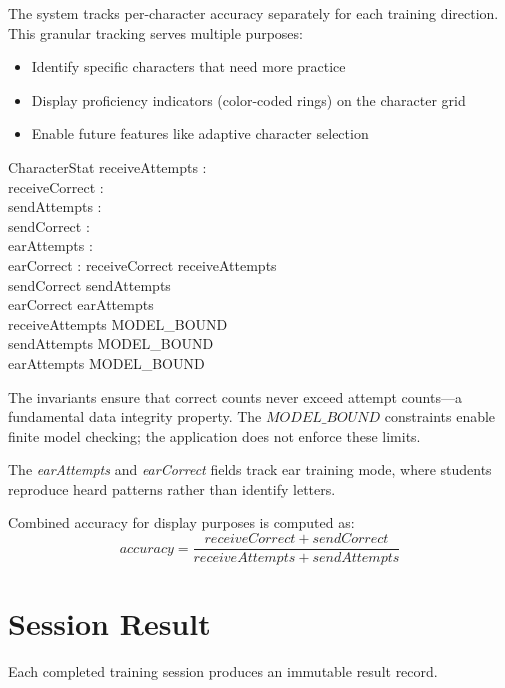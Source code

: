 \documentclass[a4paper,10pt,fleqn]{article}
\begin{document}
The system tracks per-character accuracy separately for each training direction.
This granular tracking serves multiple purposes:

\begin{itemize}
\item Identify specific characters that need more practice
\item Display proficiency indicators (color-coded rings) on the character grid
\item Enable future features like adaptive character selection
\end{itemize}

\begin{schema}{CharacterStat}
receiveAttempts : \nat \\
receiveCorrect : \nat \\
sendAttempts : \nat \\
sendCorrect : \nat \\
earAttempts : \nat \\
earCorrect : \nat
\where
receiveCorrect \leq receiveAttempts \\
sendCorrect \leq sendAttempts \\
earCorrect \leq earAttempts \\
receiveAttempts \leq MODEL\_BOUND \\
sendAttempts \leq MODEL\_BOUND \\
earAttempts \leq MODEL\_BOUND
\end{schema}

The invariants ensure that correct counts never exceed attempt counts---a
fundamental data integrity property. The $MODEL\_BOUND$ constraints enable
finite model checking; the application does not enforce these limits.

The \emph{earAttempts} and \emph{earCorrect} fields track ear training mode,
where students reproduce heard patterns rather than identify letters.

Combined accuracy for display purposes is computed as:
\[
accuracy = \frac{receiveCorrect + sendCorrect}{receiveAttempts + sendAttempts}
\]

\section{Session Result}

Each completed training session produces an immutable result record.
\end{document}
